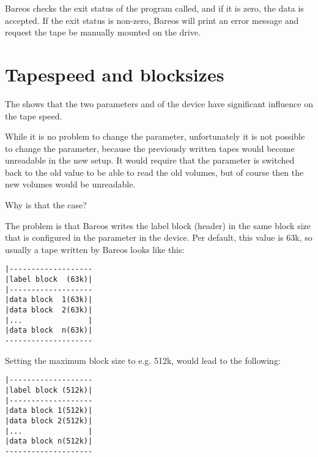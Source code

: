 Bareos checks the exit status of the program called, and if it is zero, the
data is accepted. If the exit status is non-zero, Bareos will print an
error message and request the tape be manually mounted on the drive.


\section{Tapespeed and blocksizes}
\label{Tapespeed and blocksizes}
\label{setblocksizes}

The \bareosWhitepaperTapeSpeedTuning shows that the two parameters
 and 
of the device have significant influence on the tape speed.

While it is no problem to change the  parameter,
unfortunately it is not possible to change the 
parameter, because the previously written tapes would become unreadable
in the new setup. It would require that the  parameter
is switched back to the old value to be able to read the old volumes, but
of course then the new volumes would be unreadable.

Why is that the case?

The problem is that Bareos writes the label block (header) in the same block
size that is configured in the  parameter in the device.
Per default, this value is 63k, so usually a tape written by Bareos looks like this:

\begin{verbatim}
|-------------------
|label block  (63k)|
|-------------------
|data block  1(63k)|
|data block  2(63k)|
|...               |
|data block  n(63k)|
--------------------
\end{verbatim}
Setting the maximum block size to e.g. 512k, would lead to the following:
\begin{verbatim}
|-------------------
|label block (512k)|
|-------------------
|data block 1(512k)|
|data block 2(512k)|
|...               |
|data block n(512k)|
--------------------
\end{verbatim}

